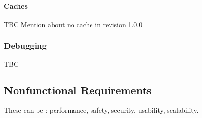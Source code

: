 \paragraph{Caches}

\begin{content}
  TBC Mention about no cache in revision 1.0.0
\end{content}

\subsubsection{Debugging}

\begin{content}
    TBC
\end{content}

\subsection{Nonfunctional Requirements}



\begin{content}
These can be : performance, safety, security, usability, scalability.
\end{content}

\newpage
